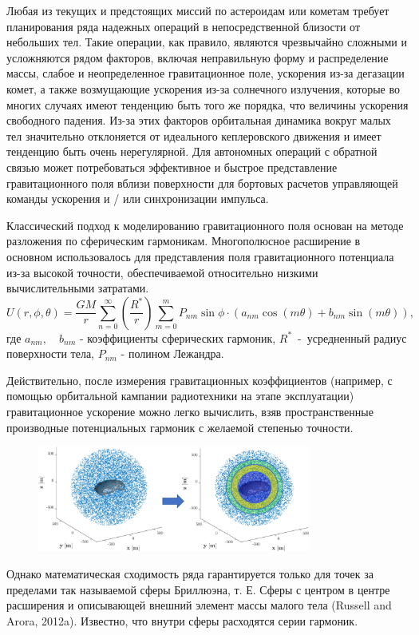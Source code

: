 Любая из текущих и предстоящих миссий по астероидам или кометам требует планирования ряда надежных операций в непосредственной близости от небольших тел.
Такие операции, как правило, являются чрезвычайно сложными и усложняются рядом факторов, включая неправильную форму и распределение массы, слабое и неопределенное гравитационное поле, ускорения из-за дегазации комет, а также возмущающие ускорения из-за солнечного излучения, которые во многих случаях имеют тенденцию быть того же порядка, что величины ускорения свободного падения.
Из-за этих факторов орбитальная динамика вокруг малых тел значительно отклоняется от идеального кеплеровского движения и имеет тенденцию быть очень нерегулярной.
Для автономных операций с обратной связью может потребоваться эффективное и быстрое представление гравитационного поля вблизи поверхности для бортовых расчетов управляющей команды ускорения и / или синхронизации импульса.

Классический подход к моделированию гравитационного поля основан на методе разложения по сферическим гармоникам. Многополюсное расширение в основном использовалось для представления поля гравитационного потенциала из-за высокой точности, обеспечиваемой относительно низкими вычислительными затратами.
\[
    U(r,\phi,\theta) = \frac{GM}{r}
        \sum_{n = 0}^{\infty} \left( \frac{R^*}{r}\right)
        \sum_{m = 0}^{m} P_{nm}\sin\phi \cdot (a_{nm}\cos(m\theta) + b_{nm}\sin(m\theta)),
\]
где $a_{nm}, \quad b_{nm}$ - коэффициенты сферических гармоник, $R^*$~-~усредненный радиус поверхности тела, $P_{nm}$ - полином Лежандра.

Действительно, после измерения гравитационных коэффициентов (например, с помощью орбитальной кампании радиотехники на этапе эксплуатации) гравитационное ускорение можно легко вычислить, взяв пространственные производные потенциальных гармоник с желаемой степенью точности.
\begin{figure}[h]
    \centering
    \includegraphics[width=0.8\textwidth]{chapters/tikhonov_s2/images/train_1.jpg}
\end{figure}
Однако математическая сходимость ряда гарантируется только для точек за пределами так называемой сферы Бриллюэна, т. Е. Сферы с центром в центре расширения и описывающей внешний элемент массы малого тела (Russell and Arora, 2012a).
Известно, что внутри сферы расходятся серии гармоник.


